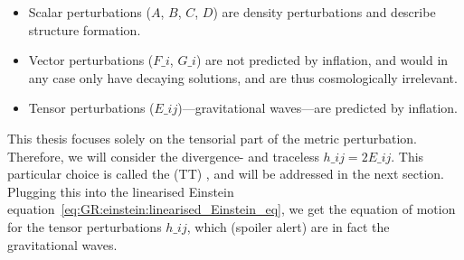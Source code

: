     \begin{itemize}
        \item Scalar perturbations ($A$, $B$, $C$, $D$) are density perturbations and describe structure formation.
        \item Vector perturbations ($F\_i$, $G\_i$) are not predicted by inflation, and would in any case only have decaying solutions, and are thus cosmologically irrelevant.
        \item Tensor perturbations ($E\_{ij}$)---gravitational waves---are predicted by inflation.
    \end{itemize}
    This thesis focuses solely on the tensorial part of the metric perturbation. Therefore, we will consider the divergence- and traceless $h\_{ij}=2E\_{ij}$. This particular choice is called the  (TT) , and will be addressed in the next section. %
    Plugging this into the linearised Einstein equation~\cref{eq:GR:einstein:linearised_Einstein_eq}, we get the equation of motion for the tensor perturbations $h\_{ij}$, which (spoiler alert) are in fact the gravitational waves.












